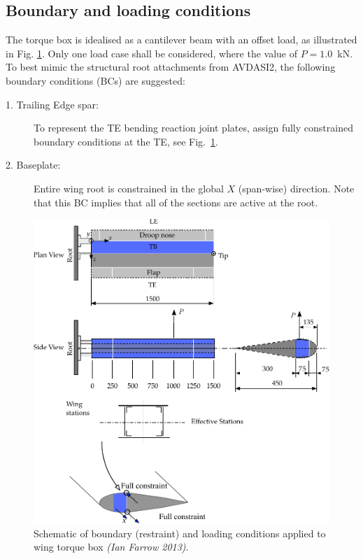 \documentclass[11pt,a4paper,oneside]{memoir}
\begin{document}
\subsection{Boundary and loading conditions} 
The torque box is idealised as a cantilever beam with an offset load, as illustrated in Fig. \ref{fig:ASD2-DBT-Wing-TB-Loading-Boundary}. Only one load case shall be considered, where the value of \mbox{$P = 1.0$ kN}. 
To best mimic the structural root attachments from AVDASI2, the following boundary conditions (BCs) are suggested:
\begin{description}
\item[1. Trailing Edge spar:] To represent the TE bending reaction joint plates, assign fully constrained boundary conditions at the TE, see Fig.~\ref{fig:ASD2-DBT-Wing-TB-Loading-Boundary}. 	
\item[2. Baseplate:] Entire wing root is constrained in the global $X$ (span-wise) direction. Note that this BC implies that all of the sections are active at the root.
\end{description}

\begin{figure}
    \centering
    \includegraphics[width=.98\textwidth]{ASD2-DBT-Wing-TB-Loading-Boundary-2018}
    \caption{Schematic of boundary (restraint) and loading conditions applied to wing torque box \textit{(Ian Farrow 2013)}.}
  \label{fig:ASD2-DBT-Wing-TB-Loading-Boundary}
\end{figure}
\clearpage
\end{document}
